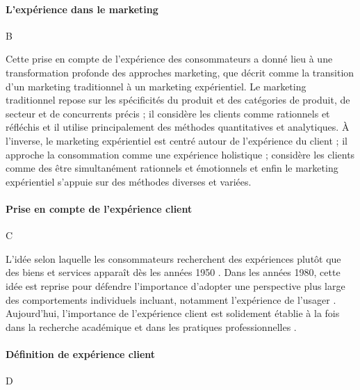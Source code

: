 \documentclass[a4paper,12pt]{report}
\begin{document}
\paragraph{L'expérience dans le marketing} B

Cette prise en compte de l'expérience des consommateurs a donné lieu à une transformation profonde des approches marketing, que \textcite{schmitt99} décrit comme la transition d'un marketing traditionnel à un marketing expérientiel. Le marketing traditionnel repose sur les spécificités du produit et des catégories de produit, de secteur et de concurrents précis ; il considère les clients comme rationnels et réfléchis et il utilise principalement des méthodes quantitatives et analytiques. À l'inverse, le marketing expérientiel est centré autour de l'expérience du client ; il approche la consommation comme une expérience holistique ; considère les clients comme des être simultanément rationnels et émotionnels et enfin le marketing expérientiel s'appuie sur des méthodes diverses et variées. \par 


\paragraph{Prise en compte de l'expérience client} C

L'idée selon laquelle les consommateurs recherchent des expériences plutôt que des biens et services apparaît dès les années 1950 \parencites{abbott55, alderson57, levy59, gardner55}. Dans les années 1980, cette idée est reprise pour défendre l'importance d'adopter une perspective plus large des comportements individuels incluant, notamment l'expérience de l'usager \parencites{hirschman82, holbrook82, thompson89, fennell85}. Aujourd'hui, l'importance de l'expérience client est solidement établie à la fois dans la recherche académique et dans les pratiques professionnelles \parencites{balo25, arkadan24, meehan24}. \par

\paragraph{Définition de expérience client} D
\end{document}
